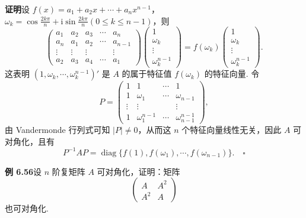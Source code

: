 \documentclass[UTF8, 12pt, fontset=fandol, oneside]{ctexart}
\begin{document}
\noindent\textbf{证明}\quad 设 $f(x)=a_1+a_2x+\cdots+a_nx^{n-1}$，$\omega_k=\cos\frac{2k\pi}{n}+\mathrm{i}\sin\frac{2k\pi}{n}(0\le k\le n-1)$，则
\[
\left(\begin{array}{ccccc}
a_1 & a_2 & a_3 & \cdots & a_n\\
a_n & a_1 & a_2 & \cdots & a_{n-1}\\
\vdots & \vdots & \vdots & & \vdots\\
a_2 & a_3 & a_4 & \cdots & a_1
\end{array}\right)
\left(\begin{array}{c}
1\\
\omega_k\\
\vdots\\
\omega_k^{n-1}
\end{array}\right)
=f(\omega_k)\left(\begin{array}{c}
1\\
\omega_k\\
\vdots\\
\omega_k^{n-1}
\end{array}\right).
\]
这表明 $(1,\omega_k,\cdots,\omega_k^{n-1})'$ 是 $A$ 的属于特征值 $f(\omega_k)$ 的特征向量. 令
\[
P=\left(\begin{array}{cccc}
1 & 1 & \cdots & 1\\
1 & \omega_1 & \cdots & \omega_{n-1}\\
\vdots & \vdots & & \vdots\\
1 & \omega_1^{n-1} & \cdots & \omega_{n-1}^{n-1}
\end{array}\right),
\]
由 Vandermonde 行列式可知 $|P|\ne 0$，从而这 $n$ 个特征向量线性无关，因此 $A$ 可对角化，且有
\[
P^{-1}AP=\operatorname{diag}\{f(1),f(\omega_1),\cdots,f(\omega_{n-1})\}. \quad \square
\]

\noindent\textbf{例 6.56}\quad 设 $n$ 阶复矩阵 $A$ 可对角化，证明：矩阵
\[
\left(\begin{array}{cc}
A & A^2\\
A^2 & A
\end{array}\right)
\]
也可对角化.
\end{document}
